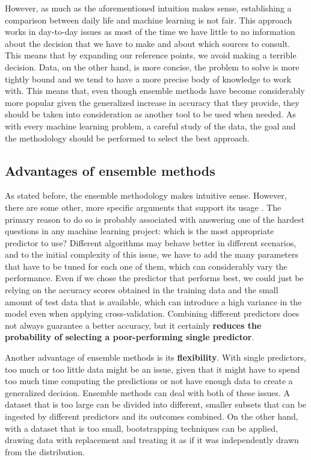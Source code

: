 \documentclass{article}
\begin{document}
However, as much as the aforementioned intuition makes sense, establishing a comparison between daily life and machine learning is not fair. This approach works in day-to-day issues as most of the time we have little to no information about the decision that we have to make and about which sources to consult. This means that by expanding our reference points, we avoid making a terrible decision. Data, on the other hand, is more concise, the problem to solve is more tightly bound and we tend to have a more precise body of knowledge to work with. This means that, even though ensemble methods have become considerably more popular given the generalized increase in accuracy that they provide, they should be taken into consideration as another tool to be used when needed. As with every machine learning problem, a careful study of the data, the goal and the methodology should be performed to select the best approach.

\subsection{Advantages of ensemble methods}
As stated before, the ensemble methodology makes intuitive sense. However, there are some other, more specific arguments that support its usage \textbf{\cite{Polikar:2009}}. The primary reason to do so is probably associated with answering one of the hardest questions in any machine learning project: which is the most appropriate predictor to use? Different algorithms may behave better in different scenarios, and to the initial complexity of this issue, we have to add the many parameters that have to be tuned for each one of them, which can considerably vary the performance. Even if we chose the predictor that performs best, we could just be relying on the accuracy scores obtained in the training data and the small amount of test data that is available, which can introduce a high variance in the model even when applying cross-validation. Combining different predictors does not always guarantee a better accuracy, but it certainly \textbf{reduces the probability of selecting a poor-performing single predictor}.

Another advantage of ensemble methods is its \textbf{flexibility}. With single predictors, too much or too little data might be an issue, given that it might have to spend too much time computing the predictions or not have enough data to create a generalized decision. Ensemble methods can deal with both of these issues. A dataset that is too large can be divided into different, smaller subsets that can be ingested by different predictors and its outcomes combined. On the other hand, with a dataset that is too small, bootstrapping techniques can be applied, drawing data with replacement and treating it as if it was independently drawn from the distribution.
\end{document}
